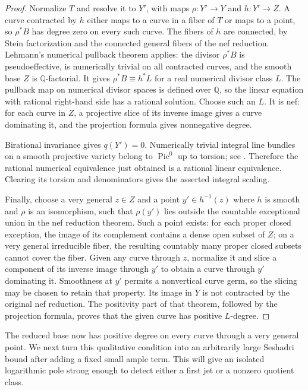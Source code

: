 \begin{proof}
Normalize $T$ and resolve it to $Y'$, with maps $\rho:Y'\to Y$ and
$h:Y'\to Z$.  A curve contracted by $h$ either maps to a curve in a
fiber of $T$ or maps to a point, so $\rho^*B$ has degree zero on every
such curve.  The fibers of $h$ are connected, by Stein factorization
and the connected general fibers of the nef reduction.  Lehmann's
numerical pullback theorem \cite[Theorem~1.2]{Lehmann2015} applies:
the divisor $\rho^*B$ is pseudoeffective, is numerically trivial on
all contracted curves, and the smooth base $Z$ is $\mathbb Q$-factorial.
It gives $\rho^*B\equiv h^*L$ for a real numerical divisor class $L$.
The pullback map on numerical divisor spaces is defined over
$\mathbb Q$, so the linear equation with rational right-hand side
has a rational solution.  Choose such an $L$.  It is nef: for each
curve in $Z$, a projective slice of its inverse image gives a curve
dominating it, and the projection formula gives nonnegative degree.

Birational invariance gives $q(Y')=0$.  Numerically trivial integral
line bundles on a smooth projective variety belong to $\operatorname{Pic}^0$
up to torsion; see \cite[Definition~6.1 and Theorem~6.3]{Kleiman2005}.  Therefore the rational numerical equivalence just
obtained is a rational linear equivalence.  Clearing its torsion and
denominators gives the asserted integral scaling.

Finally, choose a very general $z\in Z$ and a point $y'\in h^{-1}(z)$
where $h$ is smooth and $\rho$ is an isomorphism, such that $\rho(y')$
lies outside the countable exceptional union in the nef reduction
theorem.  Such a point exists: for each proper closed exception, the
image of its complement contains a dense open subset of $Z$; on a very
general irreducible fiber, the resulting countably many proper closed
subsets cannot cover the fiber.  Given any curve through $z$, normalize
it and slice a component of its inverse image through $y'$ to obtain
a curve through $y'$ dominating it.  Smoothness at $y'$ permits a
nonvertical curve germ, so the slicing may be chosen to retain that
property.  Its image in $Y$ is not contracted by the original nef
reduction.  The positivity part of that theorem, followed by the
projection formula, proves that the given curve has positive
$L$-degree.
\end{proof}

The reduced base now has positive degree on every curve through a
very general point.  We next turn this qualitative condition into
an arbitrarily large Seshadri bound after adding a fixed small ample
term.  This will give an isolated logarithmic pole strong enough to
detect either a first jet or a nonzero quotient class.

